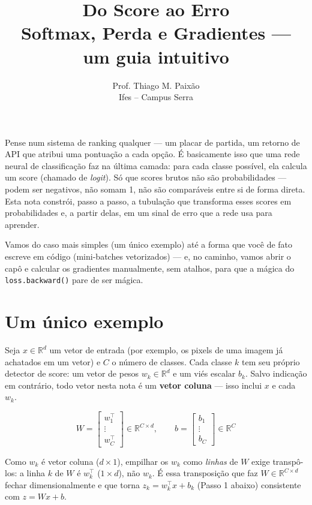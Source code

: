 \documentclass[11pt]{article}
\title{\vspace{-1.5cm}\Large\bfseries Do Score ao Erro\\[4pt]\normalsize\normalfont Softmax, Perda e Gradientes --- um guia intuitivo}
\author{Prof. Thiago M. Paixão \\ \small Ifes -- Campus Serra}
\date{}
\newcommand{\R}{\mathbb{R}}
\begin{document}
\maketitle
\vspace{-1cm}

Pense num sistema de ranking qualquer --- um placar de partida, um retorno de API que atribui uma pontuação a cada opção. É basicamente isso que uma rede neural de classificação faz na última camada: para cada classe possível, ela calcula um score (chamado de \emph{logit}). Só que scores brutos não são probabilidades --- podem ser negativos, não somam 1, não são comparáveis entre si de forma direta. Esta nota constrói, passo a passo, a tubulação que transforma esses scores em probabilidades e, a partir delas, em um sinal de erro que a rede usa para aprender.

Vamos do caso mais simples (um único exemplo) até a forma que você de fato escreve em código (mini-batches vetorizados) --- e, no caminho, vamos abrir o capô e calcular os gradientes manualmente, sem atalhos, para que a mágica do \texttt{loss.backward()} pare de ser mágica.

\section{Um único exemplo}

Seja $x \in \R^d$ um vetor de entrada (por exemplo, os pixels de uma imagem já achatados em um vetor) e $C$ o número de classes. Cada classe $k$ tem seu próprio detector de score: um vetor de pesos $w_k \in \R^d$ e um viés escalar $b_k$. Salvo indicação em contrário, todo vetor nesta nota é um \textbf{vetor coluna} --- isso inclui $x$ e cada $w_k$.

$$
W = \begin{bmatrix} w_1^\top \\ \vdots \\ w_C^\top \end{bmatrix} \in \R^{C\times d},
\qquad
b = \begin{bmatrix} b_1 \\ \vdots \\ b_C \end{bmatrix} \in \R^C
$$

\begin{revisao}
Como $w_k$ é vetor coluna ($d\times 1$), empilhar os $w_k$ como \emph{linhas} de $W$ exige transpô-los: a linha $k$ de $W$ é $w_k^\top$ ($1\times d$), não $w_k$. É essa transposição que faz $W \in \R^{C\times d}$ fechar dimensionalmente e que torna $z_k = w_k^\top x + b_k$ (Passo 1 abaixo) consistente com $z = Wx + b$.
\end{revisao}
\end{document}
